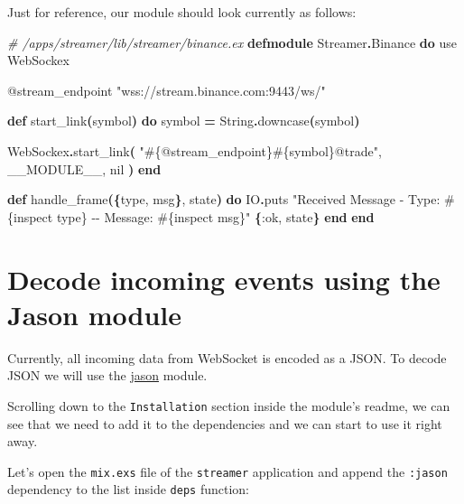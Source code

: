 \documentclass[
  oneside]{book}
\newenvironment{Shaded}{\begin{snugshade}}{\end{snugshade}}
\newcommand{\CommentTok}[1]{\textcolor[rgb]{0.56,0.35,0.01}{\textit{#1}}}
\newcommand{\ConstantTok}[1]{\textcolor[rgb]{0.56,0.35,0.01}{#1}}
\newcommand{\FunctionTok}[1]{\textcolor[rgb]{0.13,0.29,0.53}{\textbf{#1}}}
\newcommand{\ImportTok}[1]{#1}
\newcommand{\KeywordTok}[1]{\textcolor[rgb]{0.13,0.29,0.53}{\textbf{#1}}}
\newcommand{\NormalTok}[1]{#1}
\newcommand{\OperatorTok}[1]{\textcolor[rgb]{0.81,0.36,0.00}{\textbf{#1}}}
\newcommand{\OtherTok}[1]{\textcolor[rgb]{0.56,0.35,0.01}{#1}}
\newcommand{\StringTok}[1]{\textcolor[rgb]{0.31,0.60,0.02}{#1}}
\newcommand{\VariableTok}[1]{\textcolor[rgb]{0.00,0.00,0.00}{#1}}
\begin{document}
Just for reference, our module should look currently as follows:

\begin{Shaded}
\begin{Highlighting}[]
\CommentTok{\# /apps/streamer/lib/streamer/binance.ex}
\KeywordTok{defmodule} \ConstantTok{Streamer}\OperatorTok{.}\ConstantTok{Binance} \KeywordTok{do}
  \ImportTok{use} \ConstantTok{WebSockex}

  \OtherTok{@stream\_endpoint} \StringTok{"wss://stream.binance.com:9443/ws/"}

  \KeywordTok{def}\NormalTok{ start\_link}\FunctionTok{(}\NormalTok{symbol}\FunctionTok{)} \KeywordTok{do}
\NormalTok{    symbol }\OperatorTok{=} \ConstantTok{String}\OperatorTok{.}\NormalTok{downcase}\FunctionTok{(}\NormalTok{symbol}\FunctionTok{)}

    \ConstantTok{WebSockex}\OperatorTok{.}\NormalTok{start\_link}\FunctionTok{(}
      \StringTok{"}\OtherTok{\#\{@stream\_endpoint\}\#\{}\NormalTok{symbol}\OtherTok{\}}\StringTok{@trade"}\NormalTok{,}
      \ConstantTok{\_\_MODULE\_\_}\NormalTok{,}
      \ConstantTok{nil}
    \FunctionTok{)}
  \KeywordTok{end}

  \KeywordTok{def}\NormalTok{ handle\_frame}\FunctionTok{(\{}\NormalTok{type, msg}\FunctionTok{\}}\NormalTok{, state}\FunctionTok{)} \KeywordTok{do}
    \ConstantTok{IO}\OperatorTok{.}\NormalTok{puts }\StringTok{"Received Message {-} Type: }\OtherTok{\#\{}\NormalTok{inspect type}\OtherTok{\}}\StringTok{ {-}{-} Message: }\OtherTok{\#\{}\NormalTok{inspect msg}\OtherTok{\}}\StringTok{"}
    \FunctionTok{\{}\VariableTok{:ok}\NormalTok{, state}\FunctionTok{\}}
  \KeywordTok{end}
\KeywordTok{end}
\end{Highlighting}
\end{Shaded}

\section{Decode incoming events using the Jason module}\label{decode-incoming-events-using-the-jason-module}

Currently, all incoming data from WebSocket is encoded as a JSON. To decode JSON we will use the \href{https://github.com/michalmuskala/jason}{jason} module.

Scrolling down to the \texttt{Installation} section inside the module's readme, we can see that we need to add it to the dependencies and we can start to use it right away.

Let's open the \texttt{mix.exs} file of the \texttt{streamer} application and append the \texttt{:jason} dependency to the list inside \texttt{deps} function:
\end{document}
